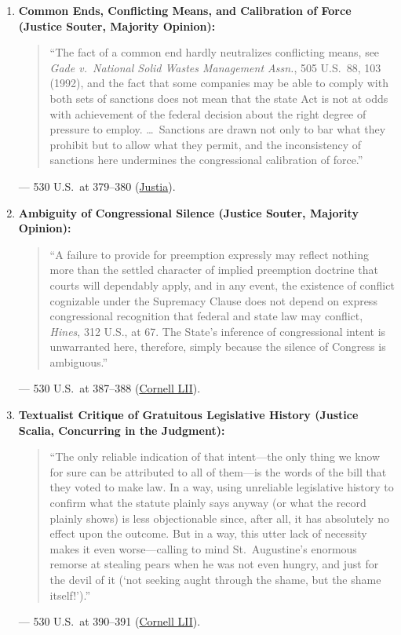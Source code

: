\documentclass[12pt]{article}
\begin{document}
\begin{enumerate}
    \item \textbf{Common Ends, Conflicting Means, and Calibration of Force (Justice Souter, Majority Opinion):}
    \begin{quote}
        ``The fact of a common end hardly neutralizes conflicting means, see \textit{Gade v.\ National Solid Wastes Management Assn.}, 505 U.S.\ 88, 103 (1992), and the fact that some companies may be able to comply with both sets of sanctions does not mean that the state Act is not at odds with achievement of the federal decision about the right degree of pressure to employ. \dots\ Sanctions are drawn not only to bar what they prohibit but to allow what they permit, and the inconsistency of sanctions here undermines the congressional calibration of force.''
    \end{quote}
    --- 530 U.S.\ at 379--380 (\href{https://supreme.justia.com/cases/federal/us/530/363/}{Justia}).

    \item \textbf{Ambiguity of Congressional Silence (Justice Souter, Majority Opinion):}
    \begin{quote}
        ``A failure to provide for preemption expressly may reflect nothing more than the settled character of implied preemption doctrine that courts will dependably apply, and in any event, the existence of conflict cognizable under the Supremacy Clause does not depend on express congressional recognition that federal and state law may conflict, \textit{Hines}, 312 U.S., at 67. The State's inference of congressional intent is unwarranted here, therefore, simply because the silence of Congress is ambiguous.''
    \end{quote}
    --- 530 U.S.\ at 387--388 (\href{https://www.law.cornell.edu/supct/html/99-474.ZO.html}{Cornell LII}).

    \item \textbf{Textualist Critique of Gratuitous Legislative History (Justice Scalia, Concurring in the Judgment):}
    \begin{quote}
        ``The only reliable indication of that intent---the only thing we know for sure can be attributed to all of them---is the words of the bill that they voted to make law. In a way, using unreliable legislative history to confirm what the statute plainly says anyway (or what the record plainly shows) is less objectionable since, after all, it has absolutely no effect upon the outcome. But in a way, this utter lack of necessity makes it even worse---calling to mind St.\ Augustine's enormous remorse at stealing pears when he was not even hungry, and just for the devil of it (`not seeking aught through the shame, but the shame itself!').''
    \end{quote}
    --- 530 U.S.\ at 390--391 (\href{https://www.law.cornell.edu/supct/html/99-474.ZC.html}{Cornell LII}).
\end{enumerate}
\end{document}
